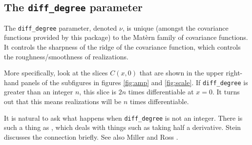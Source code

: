 \subsection{The \texttt{diff_degree} parameter}\label{sub:diffdegree}
The \texttt{diff_degree} parameter, denoted $\nu$, is unique (amongst the covariance functions provided by this package) to the Mat\`ern family of covariance functions. It controls the sharpness of the ridge of the covariance function, which controls the roughness/smoothness of realizations.

More specifically, look at the slices $C(x,0)$ that are shown in the upper right-hand panels of the subfigures in figures \ref{fig:amp} and \ref{fig:scale}. If \texttt{diff_degree} is greater than an integer $n$, this slice is $2n$ times differentiable at $x=0$. It turns out that this means realizations will be $n$ times differentiable.

It is natural to ask what happens when \texttt{diff_degree} is not an integer. There is such a thing as , which deals with things such as taking half a derivative. Stein \cite{stein} discusses the connection briefly. See also Miller and Ross \cite{fraccalc}.

